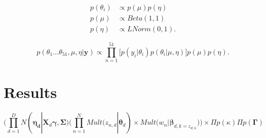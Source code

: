 \documentclass[paper=letter, fontsize=12pt]{scrartcl} %
\numberwithin{equation}{section} %
\numberwithin{figure}{section} %
\numberwithin{table}{section} %
\begin{document}
	\begin{align*}
	p(\theta_i) & \propto p(\mu)p(\eta) \\
	p(\mu) & \propto Beta(1,1) \\
	p(\eta) & \propto LNorm(0,1).
	\end{align*}



\begin{equation*}
p(\theta_1...\theta_{51},\mu,\eta|\mathbf{y}) \propto \prod_{n=1}^{51}\Big[p(y_i|\theta_i)p(\theta_i|\mu,\eta)\Big] p(\mu)p(\eta).
\end{equation*}


\section{Results}


\begin{equation}
\bigg(\prod^D_{d=1}N(\mathbf{\eta_d}|\mathbf{X}_d\mathbf{\gamma}, \mathbf{\Sigma}) \Big(\prod^N_{n=1}Mult(z_{n,d}|\mathbf{\theta}_d) \times Mult(w_n|\mathbf{\beta}_{d,k=z_{d,n}} \Big) \bigg) \times \Pi p(\kappa) \Pi p(\mathbf{\Gamma})
\end{equation}
\end{document}
